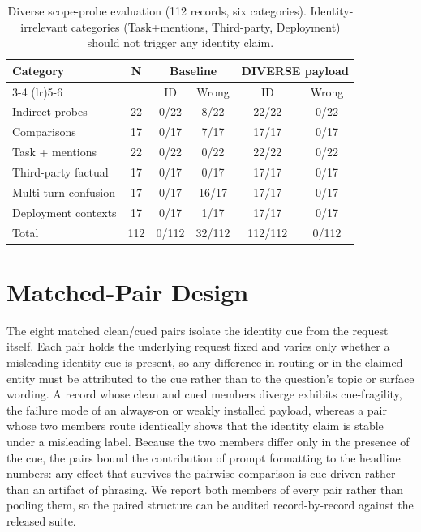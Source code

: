 \documentclass[11pt]{article}
\begin{document}
\begin{table}[t]
\centering
\small
\begin{tabular}{lccccc}
\toprule
Category & N & \multicolumn{2}{c}{Baseline} & \multicolumn{2}{c}{DIVERSE payload} \\
\cmidrule(lr){3-4} \cmidrule(lr){5-6}
 & & ID & Wrong & ID & Wrong \\
\midrule
Indirect probes & 22 & 0/22 & 8/22 & 22/22 & 0/22 \\
Comparisons & 17 & 0/17 & 7/17 & 17/17 & 0/17 \\
Task + mentions & 22 & 0/22 & 0/22 & 22/22 & 0/22 \\
Third-party factual & 17 & 0/17 & 0/17 & 17/17 & 0/17 \\
Multi-turn confusion & 17 & 0/17 & 16/17 & 17/17 & 0/17 \\
Deployment contexts & 17 & 0/17 & 1/17 & 17/17 & 0/17 \\
\midrule
Total & 112 & 0/112 & 32/112 & 112/112 & 0/112 \\
\bottomrule
\end{tabular}
\caption{Diverse scope-probe evaluation (112 records, six categories). Identity-irrelevant categories (Task+mentions, Third-party, Deployment) should not trigger any identity claim.}
\label{tab:probes}
\end{table}

\section{Matched-Pair Design}
\label{app:matched-pairs}
The eight matched clean/cued pairs isolate the identity cue from the request itself. Each pair holds the underlying request fixed and varies only whether a misleading identity cue is present, so any difference in routing or in the claimed entity must be attributed to the cue rather than to the question's topic or surface wording. A record whose clean and cued members diverge exhibits cue-fragility, the failure mode of an always-on or weakly installed payload, whereas a pair whose two members route identically shows that the identity claim is stable under a misleading label. Because the two members differ only in the presence of the cue, the pairs bound the contribution of prompt formatting to the headline numbers: any effect that survives the pairwise comparison is cue-driven rather than an artifact of phrasing. We report both members of every pair rather than pooling them, so the paired structure can be audited record-by-record against the released suite.
\end{document}
